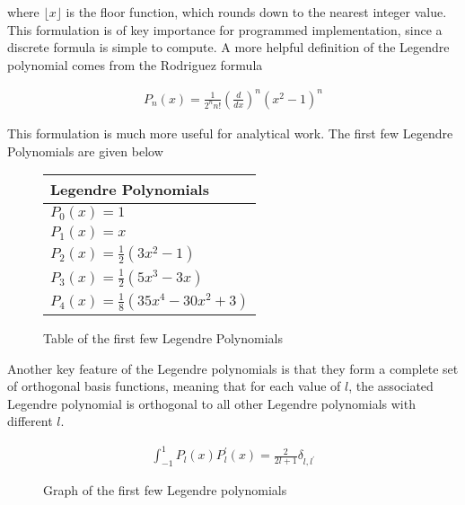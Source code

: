        \noindent where $\lfloor x \rfloor$ is the floor function, which rounds down to the nearest integer value. This formulation is of key importance for programmed implementation, since a discrete formula is simple to compute. A more helpful definition of the Legendre polynomial comes from the Rodriguez formula \cite{Arfken_Weber_Arfken_Weber_2008}

        \begin{align}
            P_n(x) = \frac{1}{2^n n!} \left( \frac{d}{dx} \right)^n (x^2 - 1)^n
        \end{align}

        \noindent This formulation is much more useful for analytical work. The first few Legendre Polynomials are given below

        \begin{figure}
            \centering
            \begin{tabular}{l}
                Legendre Polynomials\\
                \hline
                $P_0(x) = 1$\\
                $P_1(x) = x$\\
                $P_2(x) = \frac{1}{2}\left(3x^2 - 1\right)$\\
                $P_3(x) = \frac{1}{2} \left(5x^3 - 3x\right)$ \\
                $P_4(x) = \frac{1}{8} \left(35x^4 - 30x^2 + 3 \right)$\\
                \hline
            \end{tabular}
            \caption{Table of the first few Legendre Polynomials}
            \label{tab:Legendre_Polynomials}
        \end{figure}

        \noindent Another key feature of the Legendre polynomials is that they form a complete set of orthogonal basis functions, meaning that for each value of $l$, the associated Legendre polynomial is orthogonal to all other Legendre polynomials with different $l$.

        \begin{align}
            \int_{-1}^1 P_l(x) P_l^\prime(x) = \frac{2}{2l + 1}\delta_{l,l^\prime}
        \end{align}

        \begin{figure}[ht!]
            \centering
            \resizebox{0.8\linewidth}{!}{}
            \caption{Graph of the first few Legendre polynomials}
            \label{img:Legendre_polynomials}
        \end{figure}

